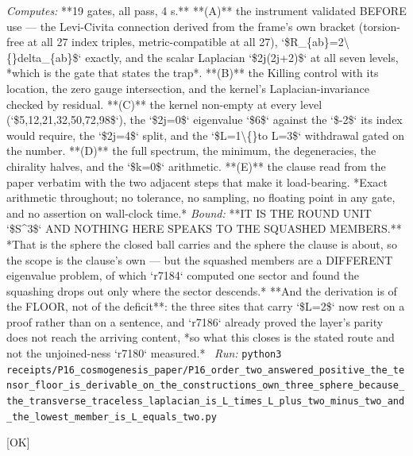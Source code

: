 \begin{description}
\emph{Computes:} **19 gates, all pass, 4 s.** **(A)** the instrument validated BEFORE use --- the Levi-Civita connection derived from the frame's own bracket (torsion-free at all 27 index triples, metric-compatible at all 27), `\$R\_\{ab\}=2\textbackslash\{\}delta\_\{ab\}\$` exactly, and the scalar Laplacian `\$2j(2j+2)\$` at all seven levels, *which is the gate that states the trap*. **(B)** the Killing control with its location, the zero gauge intersection, and the kernel's Laplacian-invariance checked by residual. **(C)** the kernel non-empty at every level (`\$5,12,21,32,50,72,98\$`), the `\$2j=0\$` eigenvalue `\$6\$` against the `\$-2\$` its index would require, the `\$2j=4\$` split, and the `\$L=1\textbackslash\{\}to L=3\$` withdrawal gated on the number. **(D)** the full spectrum, the minimum, the degeneracies, the chirality halves, and the `\$k=0\$` arithmetic. **(E)** the clause read from the paper verbatim with the two adjacent steps that make it load-bearing. *Exact arithmetic throughout; no tolerance, no sampling, no floating point in any gate, and no assertion on wall-clock time.*
 \emph{Bound:}  **IT IS THE ROUND UNIT `\$S\textasciicircum{}3\$` AND NOTHING HERE SPEAKS TO THE SQUASHED MEMBERS.** *That is the sphere the closed ball carries and the sphere the clause is about, so the scope is the clause's own --- but the squashed members are a DIFFERENT eigenvalue problem, of which `r7184` computed one sector and found the squashing drops out only where the sector descends.*  **And the derivation is of the FLOOR, not of the deficit**: the three sites that carry `\$L=2\$` now rest on a proof rather than on a sentence, and `r7186` already proved the layer's parity does not reach the arriving content, *so what this closes is the stated route and not the unjoined-ness `r7180` measured.*
\ \emph{Run:} \texttt{python3 receipts/P16\_cosmogenesis\_paper/P16\_order\_two\_answered\_positive\_the\_tensor\_floor\_is\_derivable\_on\_the\_constructions\_own\_three\_sphere\_because\_the\_transverse\_traceless\_laplacian\_is\_L\_times\_L\_plus\_two\_minus\_two\_and\_the\_lowest\_member\_is\_L\_equals\_two.py}
\item[\label{rcpt:S21_a_pre_registered_negative_can_fire_without_reaching_the_claim_it_was_written_to_test_and_mine_did_while_the_order_was_wrong_about_both_defects_in_opposite_directions}\textbf{}\quad\texttt{S21\_a\_pre\_registered\_negative\_can\_fire\_without\_reaching\_the\_claim\_it\_was\_written\_to\_test\_and\_mine\_did\_while\_the\_order\_was\_wrong\_about\_both\_defects\_in\_opposite\_directions}]\hfill\textsf{[OK]}\\

\end{description}
